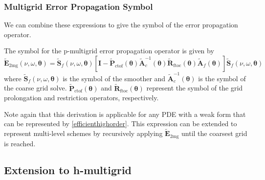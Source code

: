 \documentclass[review]{siamart190516}
\begin{document}
\subsubsection{Multigrid Error Propagation Symbol}\label{sec:multigridsymbol}

We can combine these expressions to give the symbol of the error propagation operator.

\begin{definition}\label{def:pmultigrid_symbol}
The symbol for the p-multigrid error propagation operator is given by
\begin{equation}
\tilde{\mathbf{E}}_{\text{2mg}} \left( \nu, \omega, \boldsymbol{\theta} \right) = \tilde{\mathbf{S}}_f \left( \nu, \omega, \boldsymbol{\theta} \right) \left[ \mathbf{I} - \tilde{\mathbf{P}}_{\text{ctof}} \left( \boldsymbol{\theta} \right) \tilde{\mathbf{A}}_c^{-1} \left( \boldsymbol{\theta} \right) \tilde{\mathbf{R}}_{\text{ftoc}} \left( \boldsymbol{\theta} \right) \tilde{\mathbf{A}}_f \left( \boldsymbol{\theta} \right) \right] \tilde{\mathbf{S}}_f \left( \nu, \omega, \boldsymbol{\theta} \right)
\end{equation}
where $\tilde{\mathbf{S}}_f \left( \nu, \omega, \boldsymbol{\theta} \right)$ is the symbol of the smoother and $\tilde{\mathbf{A}}_c^{-1} \left( \boldsymbol{\theta} \right)$ is the symbol of the coarse grid solve.
$\tilde{\mathbf{P}}_{\text{ctof}} \left( \boldsymbol{\theta} \right)$ and $\tilde{\mathbf{R}}_{\text{ftoc}} \left( \boldsymbol{\theta} \right)$ represent the symbol of the grid prolongation and restriction operators, respectively.
\end{definition}

Note again that this derivation is applicable for any PDE with a weak form that can be represented by \cref{efficienthighorder}.
This expression can be extended to represent multi-level schemes by recursively applying $\tilde{\mathbf{E}}_{\text{2mg}}$ until the coarsest grid is reached.

\subsection{Extension to h-multigrid}\label{sec:previouswork}
\end{document}
